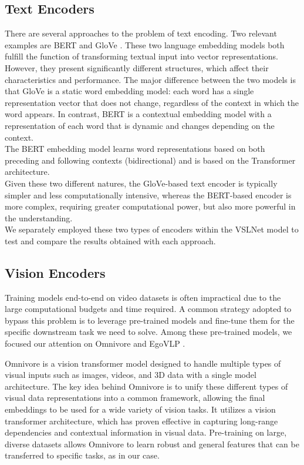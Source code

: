 \documentclass[10pt,twocolumn,letterpaper]{article}
\begin{document}
\subsection{Text Encoders}
There are several approaches to the problem of text encoding. Two relevant examples are BERT \cite{devlin2019bert} and GloVe \cite{pennington-etal-2014-glove}.
These two language embedding models both fulfill the function of transforming textual input into vector representations. However, they present significantly different structures, which affect their characteristics and performance. The major difference between the two models is that GloVe is a static word embedding model: each word has a single representation vector that does not change, regardless of the context in which the word appears. In contrast, BERT is a contextual embedding model with a representation of each word that is dynamic and changes depending on the context.\\
The BERT embedding model learns word representations based on both preceding and following contexts (bidirectional) and is based on the Transformer architecture.\\
Given these two different natures, the GloVe-based text encoder is typically simpler and less computationally intensive, whereas the BERT-based encoder is more complex, requiring greater computational power, but also more powerful in the understanding.\\
We separately employed these two types of encoders within the VSLNet model to test and compare the results obtained with each approach.

\subsection{Vision Encoders}
Training models end-to-end on video datasets is often impractical due to the large computational budgets 
and time required. A common strategy adopted to bypass this problem is to leverage pre-trained models 
and fine-tune them for the specific downstream task we need to solve. Among these pre-trained models, 
we focused our attention on Omnivore \cite{girdhar2022omnivoresinglemodelvisual} and EgoVLP \cite{lin2022egocentricvideolanguagepretraining}.

Omnivore is a vision transformer model designed to handle multiple types of visual inputs such as images, 
videos, and 3D data with a single model architecture. The key idea behind Omnivore is to unify these 
different types of visual data representations into a common framework, allowing the final embeddings to be used for a wide variety of vision tasks. It utilizes a vision transformer architecture, which has proven effective in 
capturing long-range dependencies and contextual information in visual data. Pre-training on large, diverse 
datasets allows Omnivore to learn robust and general features that can be transferred to specific tasks, as in our case.
\end{document}
